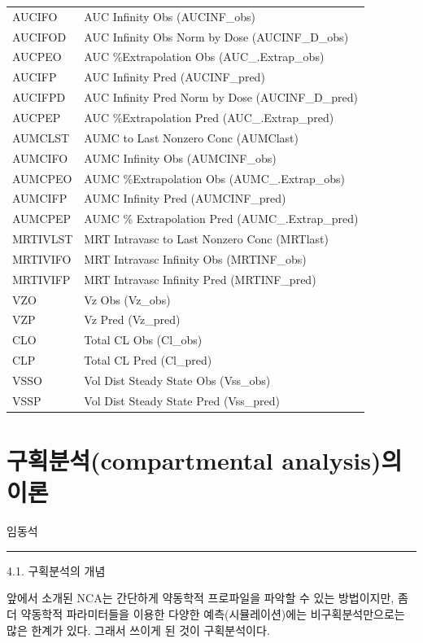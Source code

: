 \documentclass[
  11pt,
  krantz2, a4paper, twoside]{krantz}
\begin{document}
\begin{longtable}[t]{ll}
AUCIFO & AUC Infinity Obs (AUCINF\_obs)\\
AUCIFOD & AUC Infinity Obs Norm by Dose (AUCINF\_D\_obs)\\
\addlinespace
AUCPEO & AUC \%Extrapolation Obs (AUC\_.Extrap\_obs)\\
AUCIFP & AUC Infinity Pred (AUCINF\_pred)\\
AUCIFPD & AUC Infinity Pred Norm by Dose (AUCINF\_D\_pred)\\
AUCPEP & AUC \%Extrapolation Pred (AUC\_.Extrap\_pred)\\
AUMCLST & AUMC to Last Nonzero Conc (AUMClast)\\
\addlinespace
AUMCIFO & AUMC Infinity Obs (AUMCINF\_obs)\\
AUMCPEO & AUMC \%Extrapolation Obs (AUMC\_.Extrap\_obs)\\
AUMCIFP & AUMC Infinity Pred (AUMCINF\_pred)\\
AUMCPEP & AUMC \% Extrapolation Pred (AUMC\_.Extrap\_pred)\\
MRTIVLST & MRT Intravasc to Last Nonzero Conc (MRTlast)\\
\addlinespace
MRTIVIFO & MRT Intravasc Infinity Obs (MRTINF\_obs)\\
MRTIVIFP & MRT Intravasc Infinity Pred (MRTINF\_pred)\\
VZO & Vz Obs (Vz\_obs)\\
VZP & Vz Pred (Vz\_pred)\\
CLO & Total CL Obs (Cl\_obs)\\
\addlinespace
CLP & Total CL Pred (Cl\_pred)\\
VSSO & Vol Dist Steady State Obs (Vss\_obs)\\
VSSP & Vol Dist Steady State Pred (Vss\_pred)\\
\bottomrule
\end{longtable}

\hypertarget{ca-principle}{%
\chapter{구획분석(compartmental analysis)의 이론}\label{ca-principle}}

\Large\hfill

임동석
\normalsize

\begin{center}\rule{0.5\linewidth}{0.5pt}\end{center}

4.1. 구획분석의 개념

앞에서 소개된 NCA는 간단하게 약동학적 프로파일을 파악할 수 있는
방법이지만, 좀 더 약동학적 파라미터들을 이용한 다양한
예측(시뮬레이션)에는 비구획분석만으로는 많은 한계가 있다. 그래서 쓰이게
된 것이 구획분석이다.
\end{document}
